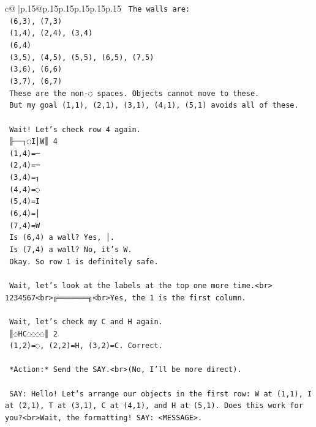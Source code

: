 \documentclass{article}
\begin{document}
{\begin{supertabular}{c@{$\;$}|p{.15\linewidth}@{}p{.15\linewidth}p{.15\linewidth}p{.15\linewidth}p{.15\linewidth}p{.15\linewidth}}
{{{\texttt{    The walls are:} \\
\texttt{    (6,3), (7,3)} \\
\texttt{    (1,4), (2,4), (3,4)} \\
\texttt{    (6,4)} \\
\texttt{    (3,5), (4,5), (5,5), (6,5), (7,5)} \\
\texttt{    (3,6), (6,6)} \\
\texttt{    (3,7), (6,7)} \\
\texttt{    These are the non{-}◌ spaces. Objects cannot move to these.} \\
\texttt{    But my goal (1,1), (2,1), (3,1), (4,1), (5,1) avoids all of these.} \\
\\ 
\texttt{    Wait! Let's check row 4 again.} \\
\texttt{    ╟──┐◌I│W║ 4} \\
\texttt{    (1,4)=─} \\
\texttt{    (2,4)=─} \\
\texttt{    (3,4)=┐} \\
\texttt{    (4,4)=◌} \\
\texttt{    (5,4)=I} \\
\texttt{    (6,4)=│} \\
\texttt{    (7,4)=W} \\
\texttt{    Is (6,4) a wall? Yes, │.} \\
\texttt{    Is (7,4) a wall? No, it's W.} \\
\texttt{    Okay. So row 1 is definitely safe.} \\
\\ 
\texttt{    Wait, let's look at the labels at the top one more time.<br> 1234567<br>╔═══════╗<br>Yes, the 1 is the first column.} \\
\\ 
\texttt{    Wait, let's check my C and H again.} \\
\texttt{    ║◌HC◌◌◌◌║ 2} \\
\texttt{    (1,2)=◌, (2,2)=H, (3,2)=C. Correct.} \\
\\ 
\texttt{    *Action:* Send the SAY.<br>(No, I'll be more direct).} \\
\\ 
\texttt{    SAY: Hello! Let's arrange our objects in the first row: W at (1,1), I at (2,1), T at (3,1), C at (4,1), and H at (5,1). Does this work for you?<br>Wait, the formatting! SAY: <MESSAGE>.} \\
}}}
\end{supertabular}}
\end{document}

